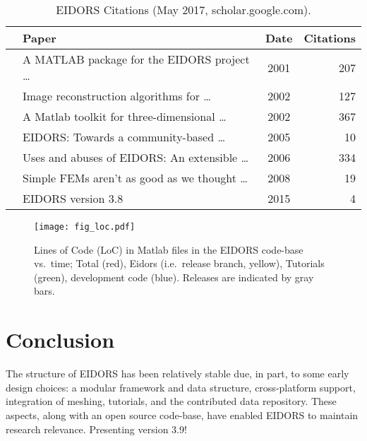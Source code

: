 \documentclass[10pt,letterpaper]{article}
\begin{document}
\begin{multicols}{2}
\begin{table}[H]
  \footnotesize
\centering
\caption{\label{tbl:cite} EIDORS Citations
 (May 2017, scholar.google.com).
}
\begin{tabular}{r@{\hspace{1mm}}lcr}
  \toprule
  & Paper & Date & \hspace{-2mm}Citations \\
  \midrule
  \cite{vauhkonen2001} & A MATLAB package for the EIDORS project \ldots\hspace{-5mm}  
    & 2001 & 207 \\
  \cite{polydorides2002phd} & Image reconstruction algorithms for \ldots
    & 2002 & 127 \\
  \cite{polydorides2002matlab} & A Matlab toolkit for three-dimensional \ldots
    & 2002 & 367 \\
  \cite{adler2005} & EIDORS: Towards a community-based \ldots
    & 2005 & 10 \\
  \cite{adler2006} & Uses and abuses of {EIDORS}: An extensible \ldots
    & 2006 & 334 \\
  \cite{adler2008} & Simple FEMs aren't as good as we thought \ldots
    & 2008 &  19 \\
  \cite{adler2015} & EIDORS version 3.8
    & 2015 & 4 \\
  \bottomrule
\end{tabular}
\vspace{-1em}
\end{table}

\begin{figure}[H]
  \vspace{-2.5mm}
\centering
 \texttt{[image: fig\_loc.pdf]}
\caption{\label{fig:loc}%
  Lines of Code (LoC) in Matlab files in the EIDORS code-base vs.\ time; Total
   (red), Eidors (i.e.\ release branch, yellow), Tutorials (green), development code (blue).
   Releases are indicated by gray bars.
}
\end{figure}

\section{Conclusion}
The structure of EIDORS has been relatively stable due, in part, to some early design choices:
a modular framework and data structure,
cross-platform support, integration of meshing,
tutorials, and the contributed data repository.
These aspects, along with an open source code-base, have enabled EIDORS to
maintain research relevance.
Presenting version 3.9!



\end{multicols}
\end{document}
